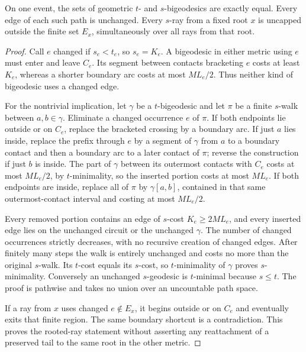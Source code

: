 \begin{proposition}\label{prop:equivalence}
On one event, the sets of geometric $t$- and $s$-bigeodesics are exactly
equal. Every edge of each such path is unchanged. Every $s$-ray from a fixed
root $x$ is uncapped outside the finite set $E_x$, simultaneously over all
rays from that root.
\end{proposition}
\begin{proof}
Call $e$ changed if $s_e<t_e$, so $s_e=K_e$. A bigeodesic in either metric
using $e$ must enter and leave $C_e$. Its segment between contacts bracketing
$e$ costs at least $K_e$, whereas a shorter boundary arc costs at most
$ML_e/2$. Thus neither kind of bigeodesic uses a changed edge.

For the nontrivial implication, let $\gamma$ be a $t$-bigeodesic and let
$\pi$ be a finite $s$-walk between $a,b\in\gamma$. Eliminate a changed
occurrence $e$ of $\pi$. If both endpoints lie outside or on $C_e$, replace
the bracketed crossing by a boundary arc. If just $a$ lies inside, replace
the prefix through $e$ by a segment of $\gamma$ from $a$ to a boundary
contact and then a boundary arc to a later contact of $\pi$; reverse the
construction if just $b$ is inside. The part of $\gamma$ between its
outermost contacts with $C_e$ costs at most $ML_e/2$, by $t$-minimality,
so the inserted portion costs at most $ML_e$. If both endpoints are inside,
replace all of $\pi$ by $\gamma[a,b]$, contained in that same outermost-contact
interval and costing at most $ML_e/2$.

Every removed portion contains an edge of $s$-cost $K_e\ge2ML_e$, and every
inserted edge lies on the unchanged circuit or the unchanged $\gamma$.
The number of changed occurrences strictly decreases, with no recursive
creation of changed edges. After finitely many steps the walk is entirely
unchanged and costs no more than the original $s$-walk. Its $t$-cost equals
its $s$-cost, so $t$-minimality of $\gamma$ proves $s$-minimality.
Conversely an unchanged $s$-geodesic is $t$-minimal because $s\le t$.
The proof is pathwise and takes no union over an uncountable path space.

If a ray from $x$ uses changed $e\notin E_x$, it begins outside or on $C_e$
and eventually exits that finite region. The same boundary shortcut is a
contradiction. This proves the rooted-ray statement without asserting any
reattachment of a preserved tail to the same root in the other metric.
\end{proof}

